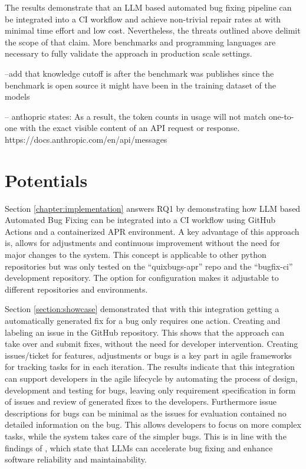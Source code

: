 The results demonstrate that an LLM based automated bug fixing pipeline can be integrated into a CI workflow and achieve non-trivial repair rates at with minimal time effort and low cost.
Nevertheless, the threats outlined above delimit the scope of that claim. More benchmarks and programming languages are necessary to fully validate the approach in production scale settings.

--add that knowledge cutoff is after the benchmark was publishes since the benchmark is open source it might have been in the training dataset of the models


-- anthopric states: As a result, the token counts in usage will not match one-to-one with the exact visible content of an API request or response. https://docs.anthropic.com/en/api/messages

\section{Potentials}

Section \ref{chapter:implementation} answers RQ1 by demonstrating how LLM based Automated Bug Fixing can be integrated into a CI workflow using GitHub Actions and a containerized APR environment. A key advantage of this approach is, allows for adjustments and continuous improvement without the need for major changes to the system.
This concept is applicable to other python repositories but was only tested on the ``quixbugs-apr'' repo and the ``bugfix-ci'' development repository. The option for configuration makes it adjustable to different repositories and environments.

Section \ref{section:showcase} demonstrated that with this integration getting a automatically generated fix for a bug only requires one action. Creating and labeling an issue in the GitHub repository. This shows that the approach can take over and submit fixes, without the need for developer intervention. Creating issues/ticket for features, adjustments or bugs is a key part in agile frameworks for tracking tasks for in each iteration. %
The results indicate that this integration can support developers in the agile lifecycle by automating the process of design, development and testing for bugs, leaving only requirement specification in form of issues and review of generated fixes to the developers. Furthermore issue descriptions for bugs can be minimal as the issues for evaluation contained no detailed information on the bug. This allows developers to focus on more complex tasks, while the system takes care of the simpler bugs. This is in line with the findings of \cite{houLargeLanguageModels2024}, which state that LLMs can accelerate bug fixing and enhance software reliability and maintainability.

